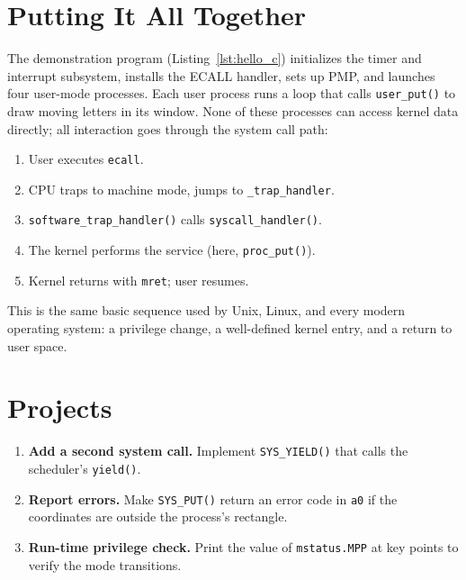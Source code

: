 \section{Putting It All Together}

The demonstration program (Listing~\ref{lst:hello_c}) initializes the timer and
interrupt subsystem, installs the ECALL handler, sets up PMP, and launches four
user-mode processes.  Each user process runs a loop that calls
\texttt{user\_put()} to draw moving letters in its window.  None of these
processes can access kernel data directly; all interaction goes through the
system call path:

\begin{enumerate}
  \item User executes \texttt{ecall}.
  \item CPU traps to machine mode, jumps to \texttt{\_trap\_handler}.
  \item \texttt{software\_trap\_handler()} calls \texttt{syscall\_handler()}.
  \item The kernel performs the service (here, \texttt{proc\_put()}).
  \item Kernel returns with \texttt{mret}; user resumes.
\end{enumerate}

This is the same basic sequence used by Unix, Linux, and every modern
operating system: a privilege change, a well-defined kernel entry, and a return
to user space.

\begin{figure}[H]
\centering

\end{figure}

\section*{Projects}
\begin{enumerate}
  \item \textbf{Add a second system call.}  Implement \texttt{SYS\_YIELD()} that
        calls the scheduler’s \texttt{yield()}.
  \item \textbf{Report errors.}  Make \texttt{SYS\_PUT()} return an error code in
        \texttt{a0} if the coordinates are outside the process’s rectangle.
  \item \textbf{Run-time privilege check.}  Print the value of
        \texttt{mstatus.MPP} at key points to verify the mode transitions.
\end{enumerate}
